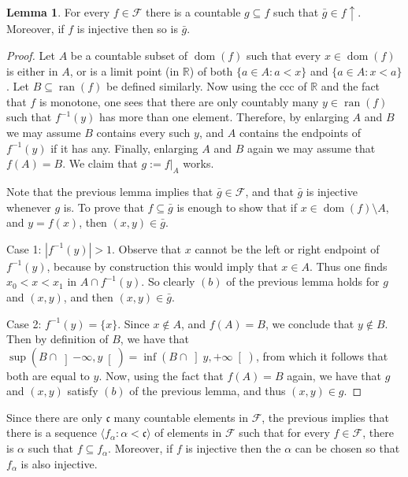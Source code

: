 \documentclass[10pt]{amsart}
\theoremstyle{definition}
\newtheorem{lemma}[theorem]{Lemma}
\theoremstyle{remark}
\newcommand{\seb}{\subseteq}
\newcommand{\setm}{\setminus}
\newcommand{\tup}[1]{\langle#1\rangle}
\newcommand{\1}{\mathbbm{1}}
\newcommand{\cc}{\mathfrak{c}}
\newcommand{\sF}{\mathscr{F}}
\DeclareMathOperator{\dom}{dom}
\DeclareMathOperator{\ran}{ran}
\begin{document}
\begin{lemma}
  For every $f \in \sF$ there is a countable $g \seb f$ such that
  $\bar{g} \in f\!\uparrow$. Moreover, if $f$ is injective then so is $\bar{g}$.
\end{lemma}
\begin{proof}
  Let $A$ be a countable subset of $\dom(f)$
  such that every $x \in \dom(f)$ is either in
  $A$, or is a limit point (in $\mathbb{R}$) of both
  $\{a \in A : a < x\}$ and $\{a \in A : x < a\}$. Let $B \seb \ran(f)$ be
  defined similarly. Now using the ccc of $\mathbb{R}$ and
  the fact that $f$ is monotone, one sees that there are only
  countably many $y \in \ran(f)$ such that $f^{-1}(y)$ has
  more than one element. Therefore, by enlarging $A$ and $B$ we may assume
  $B$ contains every such $y$, and $A$ contains the endpoints
  of $f^{-1}(y)$ if it has any. Finally, enlarging $A$ and $B$ again
  we may assume that $f(A) = B$. We claim that
  $g := f|_{A}$ works.

  Note that the previous lemma implies
  that $\bar{g} \in \sF$, and that $\bar{g}$ is injective whenever
  $g$ is. To prove that $f \seb \bar{g}$ is enough to show that
  if $x \in \dom(f) \setm A$, and $y = f(x)$, then
  $(x,y) \in \bar{g}$.

  Case 1: $|f^{-1}(y)| > 1$. Observe that $x$ cannot be the left or right
  endpoint of $f^{-1}(y)$, because by construction this would imply that
  $x \in A$. Thus one finds $x_{0} < x < x_{1}$ in $A \cap f^{-1}(y)$.
  So clearly $(b)$ of the previous lemma holds for $g$ and $(x,y)$, and then
  $(x,y) \in \bar{g}$.

  Case 2: $f^{-1}(y) = \{x\}$. Since $x \notin A$, and $f(A) = B$,
  we conclude that $y \notin B$. Then by definition of $B$,
  we have that $\sup(B \cap \left]-\infty,y\right[) =
  \inf(B \cap \left]y,+\infty\right[)$, from which it follows that both
  are equal to $y$. Now, using the fact that $f(A) = B$ again, we
  have that $g$ and $(x,y)$ satisfy $(b)$ of the previous lemma, and
  thus $(x,y) \in g$.
\end{proof}

Since there are only $\cc$ many countable elements in $\sF$, the previous
implies that there is a sequence $\tup{f_{\alpha} : \alpha < \cc}$ of elements
in $\sF$ such that for every $f \in \sF$, there is $\alpha$ such that
$f \seb f_{\alpha}$. Moreover, if $f$ is injective then the $\alpha$ can be
chosen so that $f_{\alpha}$ is also injective.
\end{document}

